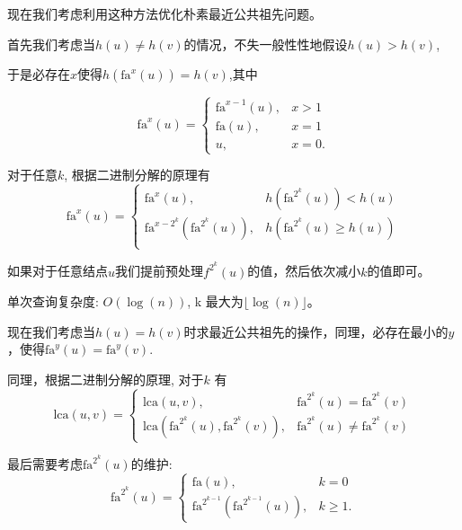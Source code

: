 \documentclass{article}
\newcommand{\lca}{\text{lca}}
\newcommand{\fa}{\text{fa}}
\begin{document}
现在我们考虑利用这种方法优化朴素最近公共祖先问题。

首先我们考虑当$h(u)\neq h(v)$的情况，不失一般性性地假设$h(u)>h(v)$,

于是必存在$x$使得$h(\fa^{x}(u)) = h(v)$,其中

\begin{equation}
    \fa^{x}(u) = \begin{cases}
        \fa^{x-1}(u), & x > 1  \\
        \fa(u),       & x = 1  \\
        u,            & x = 0.
    \end{cases}
\end{equation}

对于任意$k$, 根据二进制分解的原理有
\begin{equation}
    \fa^{x}(u) = \begin{cases}
        \fa^{x}(u),                  & h(\fa^{2^k}(u)) < h(u)   \\
        \fa^{x - 2^k}(\fa^{2^k}(u)), & h(\fa^{2^k}(u)\geq h(u)) \\
    \end{cases}
\end{equation}

如果对于任意结点$u$我们提前预处理$f^{2^k}(u)$的值，然后依次减小$k$的值即可。

单次查询复杂度: $O(\log(n))$, k 最大为$\lfloor \log(n) \rfloor $。

现在我们考虑当$h(u) = h(v)$时求最近公共祖先的操作，同理，必存在最小的$y$，使得$\fa^y(u) = \fa^y(v)$.

同理，根据二进制分解的原理, 对于$k$ 有
\begin{equation}
    \lca(u, v) = \begin{cases}
        \lca(u,v),                       & \fa^{2^k}(u) =  \fa^{2^k}(v)    \\
        \lca(\fa^{2^k}(u),\fa^{2^k}(v)), & \fa^{2^k}(u) \neq  \fa^{2^k}(v)
    \end{cases}
\end{equation}

最后需要考虑$\fa^{2^k}(u)$的维护:
\begin{equation}
    \fa^{2^k}(u) = \begin{cases}
        \fa(u),                            & k= 0      \\
        \fa^{2^{k - 1}}(\fa^{2^{k-1}}(u)), & k \geq 1.
    \end{cases}
\end{equation}
\end{document}

